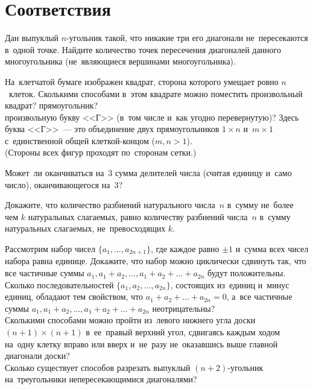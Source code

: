 
\section*{Соответствия}


\begin{problems}

\item
Дан выпуклый $n$-угольник такой, что никакие три его диагонали не~пересекаются
в~одной точке.
Найдите количество точек пересечения диагоналей данного многоугольника
(не~являющиеся вершинами многоугольника).

\item
На~клетчатой бумаге изображен квадрат, сторона которого умещает ровно
$n$~клеток.
Сколькими способами в~этом квадрате можно поместить произвольный
\\
\subproblem квадрат?
\qquad
\subproblem прямоугольник?
\\
\subproblem
произвольную букву <<Г>> (в~том числе и~как угодно перевернутую)?
Здесь буква <<Г>>~--- это объединение двух прямоугольников $1 \times n$
и~$m \times 1$ с~единственной общей клеткой-концом ($m, n > 1$).
\\
(Стороны всех фигур проходят по~сторонам сетки.)

\item
Может~ли оканчиваться на~$3$ сумма делителей числа (считая единицу и~само
число), оканчивающегося на~$3$?

\item
Докажите, что количество разбиений натурального числа~$n$ в~сумму не~более чем
$k$ натуральных слагаемых, равно количеству разбиений числа~$n$ в~сумму
натуральных слагаемых, не~превосходящих $k$.


\item
\subproblem
Рассмотрим набор чисел $\{ a_1, \ldots, a_{2n + 1} \}$, где каждое равно
$\pm 1$ и~сумма всех чисел набора равна единице.
Докажите, что набор можно циклически сдвинуть так, что все частичные суммы
$a_1, a_1 + a_2, \ldots,  a_1 + a_2 + \ldots + a_{2n}$ будут положительны.
\\
\subproblem
Сколько последовательностей $\{ a_1, a_2, \ldots, a_{2n} \}$, состоящих
из~единиц и~минус единиц, обладают тем свойством, что
$a_1 + a_2 + \ldots + a_{2n} = 0$, а~все частичные суммы
$a_1, a_1 + a_2, \ldots,  a_1 + a_2 + \ldots + a_{2n}$ неотрицательны?
\\
\subproblem
Сколькими способами можно пройти из~левого нижнего угла доски
$(n + 1) \times (n + 1)$ в~ее~правый верхний угол, сдвигаясь каждым ходом
на~одну клетку вправо или вверх и~не~разу не~оказавшись выше главной диагонали
доски?
\\
\subproblem
Сколько существует способов разрезать выпуклый $(n + 2)$-угольник
на~треугольники непересекающимися диагоналями?


\end{problems}
